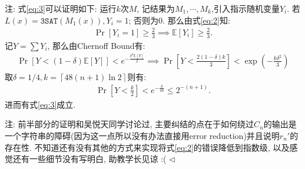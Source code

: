 \documentclass[11pt]{article}
\newcommand{\1}{\mathbf{1}}
\newenvironment{answer}[1][Solution]{\begin{trivlist}
\item[\hskip \labelsep{\bfseries#1.}\hskip \labelsep]}{\hfill$\lhd$\end{trivlist}}
\newcommand\E{\mathbb{E}}
\begin{document}
\begin{answer}
    注: 式\eqref{eq:3}可以证明如下: 运行$k$次$M$, 记结果为$M_1, \cdots, M_k$,引入指示随机变量$Y_i$. 若$L(x) = \texttt{3SAT}(M_1(x)), Y_i =1$; 否则为0. 那么由式\eqref{eq:2}知:
    \begin{align*}
        \Pr[Y_i = 1] \ge \frac{2}{3} \implies \E[Y_i] \ge \frac{2}{3}.
    \end{align*}
    记$Y = \sum Y_i$, 那么由Chernoff Bound有:
    \begin{align*}
        \Pr[Y < (1-\delta)\E[Y]] < e^{-\frac{\delta^2 \E[Y]}{2}} \implies \Pr\left[Y < \frac{2(1-\delta)k}{3} \right] < \exp\left(-\frac{k\delta^2}{3}\right)
    \end{align*}
    取$\delta = 1/4, k = \left\lceil 48(n+1)\ln 2\right\rceil$则有:
    \begin{align*}
        \Pr\left[Y < \frac{k}{2}\right] < e^{-\frac{k}{48}} \le 2^{-(n+1)}. 
    \end{align*}
    进而有式\eqref{eq:3}成立. 

    注: 前半部分的证明和吴悦天同学讨论过, 主要纠结的点在于如何绕过$C_n$的输出是一个字符串的障碍(因为这一点所以没有办法直接用error reduction)并且说明$r_n'$的存在性. 不知道还有没有其他的方式来实现将式\eqref{eq:2}的错误降低到指数级, 以及感觉还有一些细节没有写明白, 助教学长见谅 :(
\end{answer}
\end{document}

